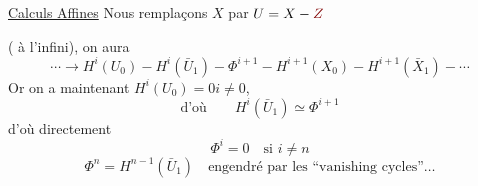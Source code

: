 \uline{Calculs Affines}\qquad
Nous remplaçons $X$ par $U=X-\unsure{Z}$

( à l'infini), on aura
\[
\cdots\longrightarrow H^i(U_0)\mathbin{-}H^i(\bar U_1)
\mathbin{-}\Phi^{i+1}\mathbin{-}H^{i+1}(X_0)
\mathbin{-}H^{i+1}(\bar X_1)\mathbin{-}\cdots
\]
Or on a maintenant \uline{$H^i(U_0)=0$}\qquad $i\ne0$,
\[
\text{d'où}\qquad H^i(\bar U_1)\simeq\Phi^{i+1}
\]
d'où directement
\[
\Phi^i=0\quad\text{si }i\ne n
\]
\[
\Phi^n=H^{n-1}(\bar U_1)
\quad\text{engendré par les ``vanishing cycles''}\ldots
\]
